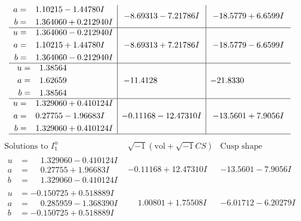 \documentclass[1p]{elsarticle_modified}
\theoremstyle{definition}
\newcommand{\I}{\sqrt{-1}}
\begin{document}
$$\begin{array}{c|c|c}
\begin{aligned}
a &= \phantom{-}1.10215 - 1.44780 I \\
b &= \phantom{-}1.364060 + 0.212940 I\end{aligned}
 & -8.69313 - 7.21786 I & -18.5779 + 6.6599 I \\ \hline\begin{aligned}
u &= \phantom{-}1.364060 - 0.212940 I \\
a &= \phantom{-}1.10215 + 1.44780 I \\
b &= \phantom{-}1.364060 - 0.212940 I\end{aligned}
 & -8.69313 + 7.21786 I & -18.5779 - 6.6599 I \\ \hline\begin{aligned}
u &= \phantom{-}1.38564\phantom{ +0.000000I} \\
a &= \phantom{-}1.62659\phantom{ +0.000000I} \\
b &= \phantom{-}1.38564\phantom{ +0.000000I}\end{aligned}
 & -11.4128\phantom{ +0.000000I} & -21.8330\phantom{ +0.000000I} \\ \hline\begin{aligned}
u &= \phantom{-}1.329060 + 0.410124 I \\
a &= \phantom{-}0.27755 - 1.96683 I \\
b &= \phantom{-}1.329060 + 0.410124 I\end{aligned}
 & -0.11168 - 12.47310 I & -13.5601 + 7.9056 I\\
 \hline 
 \end{array}$$\newpage$$\begin{array}{c|c|c}  
\text{Solutions to }I^u_{1}& \I (\text{vol} + \sqrt{-1}CS) & \text{Cusp shape}\\
 \hline 
\begin{aligned}
u &= \phantom{-}1.329060 - 0.410124 I \\
a &= \phantom{-}0.27755 + 1.96683 I \\
b &= \phantom{-}1.329060 - 0.410124 I\end{aligned}
 & -0.11168 + 12.47310 I & -13.5601 - 7.9056 I \\ \hline\begin{aligned}
u &= -0.150725 + 0.518889 I \\
a &= \phantom{-}0.285959 - 1.368390 I \\
b &= -0.150725 + 0.518889 I\end{aligned}
 & \phantom{-}1.00801 + 1.75508 I & -6.01712 - 6.20279 I \\ \hline\begin{aligned}

\end{aligned}
\end{array}$$
\end{document}
